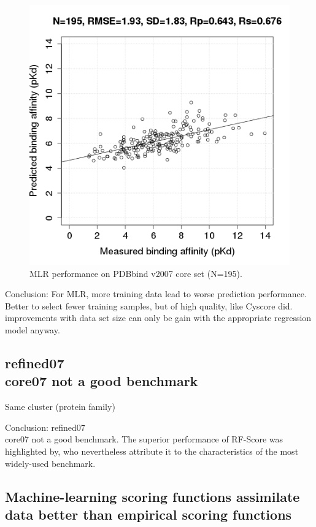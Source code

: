 \documentclass[journal=jacsat,manuscript=article]{achemso}
\begin{document}
\begin{figure}
\endminipage\hfill
{}%
\includegraphics[width=1.4\linewidth,natwidth=480,natheight=480]{../rfcyscore/x4/mlr/trn-2280-tst-195-yp.png}
\endminipage
\caption{MLR performance on PDBbind v2007 core set (N=195).}
\label{fig:mlr-tst-195}
\end{figure}

Conclusion: For MLR, more training data lead to worse prediction performance. Better to select fewer training samples, but of high quality, like Cyscore did.
improvements with data set size can only be gain with the appropriate regression model anyway.

\subsection{refined07\\core07 not a good benchmark}

Same cluster (protein family)

Conclusion: refined07\\core07 not a good benchmark.
The superior performance of RF-Score was highlighted by, who nevertheless attribute it to the characteristics of the most widely-used benchmark. \cite{774}


\subsection{Machine-learning scoring functions assimilate data better than empirical scoring functions}
\end{document}
